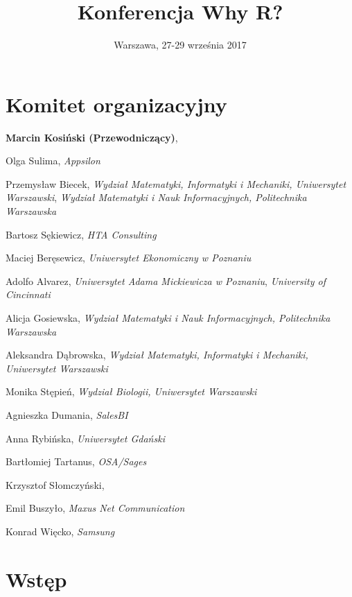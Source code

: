 \documentclass[11pt,twoside,b5paper]{book}
\title{Konferencja Why R?}
\author{Warszawa, 27-29 września 2017}
\date{}
\begin{document}


\clearpage

\frontmatter
\maketitle

\begin{small}
\tableofcontents
\end{small}

\mainmatter

\chapter{Komitet organizacyjny}

\textbf{Marcin Kosiński (Przewodniczący)},

Olga Sulima, \textit{Appsilon}

Przemysław Biecek, \textit{Wydział Matematyki, Informatyki i Mechaniki, Uniwersytet Warszawski}, \textit{Wydział Matematyki i Nauk Informacyjnych, Politechnika Warszawska} 

Bartosz Sękiewicz, \textit{HTA Consulting}

Maciej Beręsewicz, \textit{Uniwersytet Ekonomiczny w Poznaniu}

Adolfo Alvarez, \textit{Uniwersytet Adama Mickiewicza w Poznaniu}, \textit{University of Cincinnati}

Alicja Gosiewska, \textit{Wydział Matematyki i Nauk Informacyjnych, Politechnika Warszawska}

Aleksandra Dąbrowska, \textit{Wydział Matematyki, Informatyki i Mechaniki, Uniwersytet Warszawski}

Monika Stępień, \textit{Wydział Biologii, Uniwersytet Warszawski}

Agnieszka Dumania, \textit{SalesBI}

Anna Rybińska, \textit{Uniwersytet Gdański}

Bartłomiej Tartanus, \textit{OSA/Sages}

Krzysztof Słomczyński, \textit{}

Emil Buszyło, \textit{Maxus Net Communication}

Konrad Więcko, \textit{Samsung}

\chapter{Wstęp}

\end{document}
